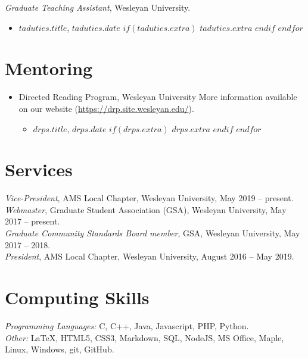 \documentclass[10pt]{res}
\newcommand{\bigsection}[1]{\section{\large{#1}}}
\begin{document}
\begin{resume}
{\sl Graduate Teaching Assistant}, Wesleyan University. \\
\begin{itemize}
  $for(taduties)$
    \item $taduties.title$, $taduties.date$
    $if(taduties.extra)$
      \subitem $taduties.extra$
    $endif$
  $endfor$
\end{itemize}

\bigsection{Mentoring}

\begin{itemize}
  \item Directed Reading Program, Wesleyan University
  \subitem More information available on our website (\href{https://drp.site.wesleyan.edu/}{https://drp.site.wesleyan.edu/}).
  \begin{itemize}
    $for(drps)$
      \item $drps.title$, $drps.date$
      $if(drps.extra)$
        \subitem $drps.extra$
      $endif$
    $endfor$
  \end{itemize}
\end{itemize}

\bigsection{Services}

{\sl Vice-President}, AMS Local Chapter, Wesleyan University, May 2019 -- present. \\
{\sl Webmaster}, Graduate Student Association (GSA), Wesleyan University, May 2017 -- present. \\
{\sl Graduate Community Standards Board member}, GSA, Wesleyan University, May 2017 -- 2018. \\
{\sl President}, AMS Local Chapter, Wesleyan University, August 2016 -- May 2019. \\

\bigsection{Computing Skills}

{\sl Programming Languages: }
C, C++, Java, Javascript, PHP, Python. \\
{\sl Other: }
LaTeX, HTML5, CSS3, Markdown,
SQL, NodeJS,
MS Office, Maple,
Linux, Windows,
git, GitHub.

\end{resume}
\end{document}
